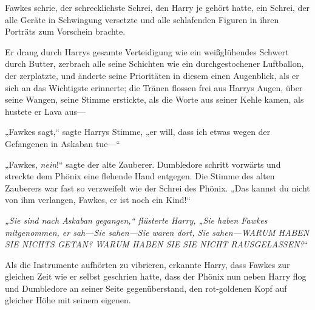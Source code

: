 Fawkes schrie, der schrecklichste Schrei, den Harry je gehört hatte, ein Schrei, der alle Geräte in Schwingung versetzte und alle schlafenden Figuren in ihren Porträts zum Vorschein brachte.

Er drang durch Harrys gesamte Verteidigung wie ein weißglühendes Schwert durch Butter, zerbrach alle seine Schichten wie ein durchgestochener Luftballon, der zerplatzte, und änderte seine Prioritäten in diesem einen Augenblick, als er sich an das Wichtigste erinnerte; die Tränen flossen frei aus Harrys Augen, über seine Wangen, seine Stimme erstickte, als die Worte aus seiner Kehle kamen, als hustete er Lava aus—

„Fawkes sagt,“ sagte Harrys Stimme, „er will, dass ich etwas wegen der Gefangenen in Askaban tue—“

„Fawkes, \emph{nein}!“ sagte der alte Zauberer. Dumbledore schritt vorwärts und streckte dem Phönix eine flehende Hand entgegen. Die Stimme des alten Zauberers war fast so verzweifelt wie der Schrei des Phönix. „Das kannst du nicht von ihm verlangen, Fawkes, er ist noch ein Kind!“

\emph{„Sie sind nach Askaban gegangen,“ flüsterte Harry, „Sie haben Fawkes mitgenommen, er sah—\emph{Sie} sahen—Sie waren \emph{dort}, Sie sahen—WARUM HABEN SIE NICHTS GETAN? WARUM HABEN SIE SIE NICHT RAUSGELASSEN?}“

Als die Instrumente aufhörten zu vibrieren, erkannte Harry, dass Fawkes zur gleichen Zeit wie er selbst geschrien hatte, dass der Phönix nun neben Harry flog und Dumbledore an seiner Seite gegenüberstand, den rot-goldenen Kopf auf gleicher Höhe mit seinem eigenen.

